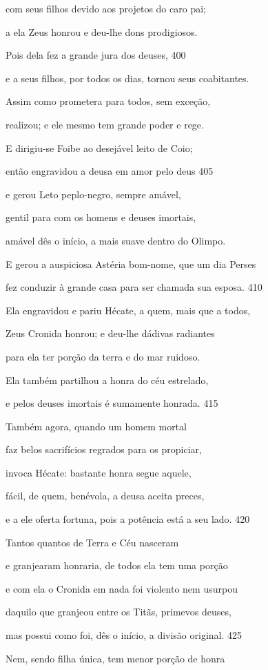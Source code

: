 com seus filhos devido aos projetos do caro pai;

a ela Zeus honrou e deu-lhe dons prodigiosos.

Pois dela fez a grande jura dos deuses, \num{400}

e a seus filhos, por todos os dias, tornou seus coabitantes.

Assim como prometera para todos, sem exceção,

realizou; e ele mesmo tem grande poder e rege.

\quad{}E dirigiu-se Foibe ao desejável leito de Coio;

então engravidou a deusa em amor pelo deus \num{405}

e gerou Leto peplo-negro, sempre amável,

gentil para com os homens e deuses imortais,

amável dês o início, a mais suave dentro do Olimpo.

E gerou a auspiciosa Astéria bom-nome, que um dia Perses

fez conduzir à grande casa para ser chamada sua esposa. \num{410}

\quad{}Ela engravidou e pariu Hécate, a quem, mais que a todos,

Zeus Cronida honrou; e deu-lhe dádivas radiantes

para ela ter porção da terra e do mar ruidoso.

Ela também partilhou a honra do céu estrelado,

e pelos deuses imortais é sumamente honrada. \num{415}

Também agora, quando um homem mortal

faz belos sacrifícios regrados para os propiciar,

invoca Hécate: bastante honra segue aquele,

fácil, de quem, benévola, a deusa aceita preces,

e a ele oferta fortuna, pois a potência está a seu lado. \num{420}

Tantos quantos de Terra e Céu nasceram

e granjearam honraria, de todos ela tem uma porção

e com ela o Cronida em nada foi violento nem usurpou

daquilo que granjeou entre os Titãs, primevos deuses,

mas possui como foi, dês o início, a divisão original. \num{425}

Nem, sendo filha única, tem menor porção de honra

